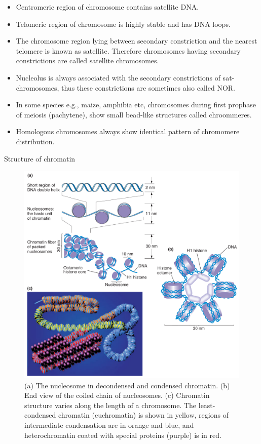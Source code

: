 \documentclass[11pt,ignorenonframetext,aspectratio=169]{beamer}
\providecommand{\tightlist}{%
  \setlength{\itemsep}{0pt}\setlength{\parskip}{0pt}}
\begin{document}
\begin{frame}{}
\protect\hypertarget{section-4}{}
\begin{itemize}
\tightlist
\item
  Centromeric region of chromosome contains satellite DNA.
\item
  Telomeric region of chromosome is highly stable and has DNA loops.
\item
  The chromosome region lying between secondary constriction and the
  nearest telomere is known as satellite. Therefore chromosomes having
  secondary constrictions are called satellite chromosomes.
\item
  Nucleolus is always associated with the secondary constrictions of
  sat-chromosomes, thus these constrictions are sometimes also called
  NOR.
\item
  In some species e.g., maize, amphibia etc, chromosomes during first
  prophase of meiosis (pachytene), show small bead-like structures
  called chroommeres.
\item
  Homologous chromosomes always show identical pattern of chromomere
  distribution.
\end{itemize}
\end{frame}

\begin{frame}{Structure of chromatin}
\protect\hypertarget{structure-of-chromatin}{}
\begin{figure}

{\centering \includegraphics[width=0.45\linewidth]{../images/structure_of_chromatin} 

}

\caption{(a) The nucleosome in decondensed and condensed chromatin. (b) End view of the coiled chain of nucleosomes. (c) Chromatin structure varies along the length of a chromosome. The least-condensed chromatin (euchromatin) is shown in yellow, regions of intermediate condensation are in orange and blue, and heterochromatin coated with special proteins (purple) is in red.}\label{fig:structure-of-chromatin}
\end{figure}
\end{frame}
\end{document}
